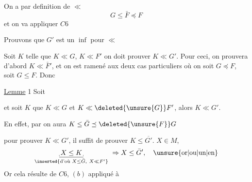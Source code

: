 
On a par definition de $\ll$
\[
 G\leq\bar F\preceq F
\]
et on va appliquer $C6$


 Prouvons que $G'$ est un $\inf$ pour $\ll$

Soit $K$ telle que $K\ll G$, $K\ll F'$ on doit prouver $K\ll G'$. Pour ceci, on prouvera d'abord $K\ll\bar F'$, et on est ramené aux deux cas particuliers où on  soit $G\preceq F$, soit $G\leq F$. Donc

\uline{Lemme} 1 Soit


et soit $K$  que $K\ll G$ et $K\ll\deleted{\unsure{G}}F'$, alors $K\ll G'$.

En effet, par   on aura $K\leq\bar G\preceq\deleted{\unsure{F}}G$


pour prouver $K\ll G'$, il suffit de prouver $K\leq\overline{G'}$.    $X\in M$,
\[
 \underset{\inserted{\text{d'où } X\leq\bar G,\ X\ll F'}}{\underline{\rule[-.5ex]{.3pt}{.45ex}\,X\leq K\,\rule[-.5ex]{.3pt}{.45ex}}}\ \Rightarrow X\leq\bar G',
 \quad\text{\unsure{or|ou|un|en}}
\]
Or cela résulte de $C6$, $(b)$ appliqué à

